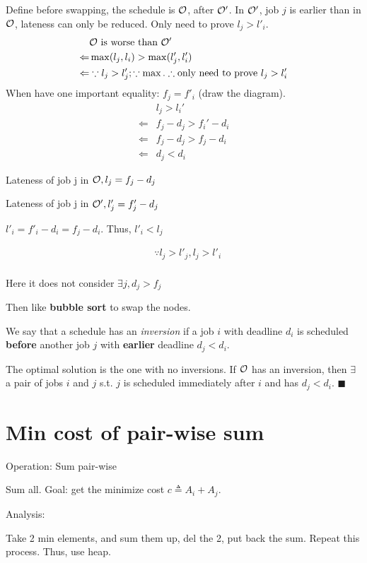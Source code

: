 \documentclass[a4paper]{report}
\theoremstyle{definition}
\begin{document}
Define before swapping, the schedule is $\mathcal{O}$, after $\mathcal{O'}$. In $\mathcal{O'}$, job $j$ is earlier than in $\mathcal{O}$, lateness can only be reduced. Only need to prove $l_j>l'_i$.
\begin{align*}
& \mathcal{O} \text{ is worse than } \mathcal{O'} \\
\Leftarrow & \max(l_j, l_i) > \max(l'_j, l'_i) \\
\Leftarrow & \because l_j > l'_j; \because \max.  \therefore \text{only need to prove } l_j>l_i'
\end{align*}
When have one important equality: $f_j=f'_i$ (draw the diagram).
\begin{align*}
& l_j > l_i'\\
\Leftarrow & f_j - d_j >f_i'-d_i \\
\Leftarrow & f_j - d_j >f_j-d_i \\
\Leftarrow & d_j < d_i
\end{align*}

Lateness of job j in $\mathcal{O}, l_j= f_j - d_j$

Lateness of job j in $\mathcal{O'}, l'_j= f'_j - d_j$

$l'_i=f'_i - d_i=f_j-d_i$. Thus, $l'_i<l_j$



\begin{align*}
&\because l_j > l'_j, l_j>l'_i\\
\end{align*}

Here it does not consider $\exists j, d_j>f_j$

Then like \textbf{bubble sort} to swap the nodes.

We say that a schedule has an \textit{inversion} if a job $i$ with deadline $d_i$ is scheduled \textbf{before} another job $j$ with \textbf{earlier} deadline $d_j<d_i$.

The optimal solution is the one with no inversions. If $\mathcal{O}$ has an inversion, then $\exists$ a pair of jobs $i$ and $j$ s.t. $j$ is scheduled immediately after $i$ and has $d_j<d_i$. $\blacksquare$

\section{Min cost of pair-wise sum}
Operation: Sum pair-wise

Sum all. Goal: get the minimize cost $c\triangleq A_i+A_j$.

Analysis:

Take 2 min elements, and sum them up, del the 2, put back the sum. Repeat this process.
Thus, use heap.
\end{document}
